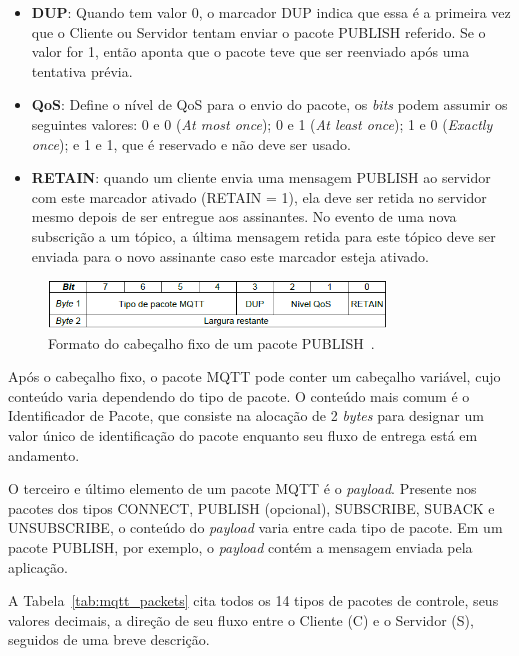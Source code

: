 \begin{itemize}
	\item \textbf{DUP}: Quando tem valor 0, o marcador DUP indica que essa é a primeira vez que o Cliente ou Servidor tentam enviar o pacote PUBLISH referido. Se o valor for 1, então aponta que o pacote teve que ser reenviado após uma tentativa prévia.
	\item \textbf{QoS}: Define o nível de QoS para o envio do pacote, os \textit{bits} podem assumir os seguintes valores: 0 e 0 (\textit{At most once}); 0 e 1 (\textit{At least once}); 1 e 0 (\textit{Exactly once}); e 1 e 1, que é reservado e não deve ser usado.
	\item \textbf{RETAIN}: quando um cliente envia uma mensagem PUBLISH ao servidor com este marcador ativado (RETAIN = 1), ela deve ser retida no servidor mesmo depois de ser entregue aos assinantes. No evento de uma
	nova subscrição a um tópico, a última mensagem retida para este tópico deve ser enviada para o
	novo assinante caso este marcador esteja ativado.
\end{itemize}

\begin{figure}[ht]
	\centering
	\includegraphics[width=0.8\textwidth]{imagens/mqtt_pubFormat.png}
	\caption{Formato do cabeçalho fixo de um pacote PUBLISH~\cite{mqttv3.1.1}.
		\label{fig:mqtt_pubFormat}}
\end{figure}
\FloatBarrier

Após o cabeçalho fixo, o pacote MQTT pode conter um cabeçalho variável, cujo conteúdo varia dependendo do tipo de pacote. O conteúdo mais comum é o Identificador de Pacote, que consiste na alocação de 2 \textit{bytes} para designar um valor único de identificação do pacote enquanto seu fluxo de entrega está em andamento.

O terceiro e último elemento de um pacote  MQTT é o \textit{payload}. Presente nos pacotes dos tipos CONNECT, PUBLISH (opcional), SUBSCRIBE, SUBACK e UNSUBSCRIBE, o conteúdo do \textit{payload} varia entre cada tipo de pacote. Em um pacote PUBLISH, por exemplo, o \textit{payload} contém a mensagem enviada pela aplicação.

A Tabela~\ref{tab:mqtt_packets} cita todos os 14 tipos de pacotes de controle, seus valores decimais, a direção de seu fluxo entre o Cliente (C) e o Servidor (S), seguidos de uma breve descrição.

